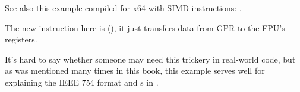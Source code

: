 See also this example compiled for x64 with SIMD instructions: .



The new instruction here is  (), it just transfers data from \ac{GPR} to the FPU's registers.



\subsectionold{\Conclusion}

It's hard to say whether someone may need this trickery in real-world code, 
but as was mentioned many times in this book, this example serves well 
for explaining the IEEE 754 format and s in \CCpp.

